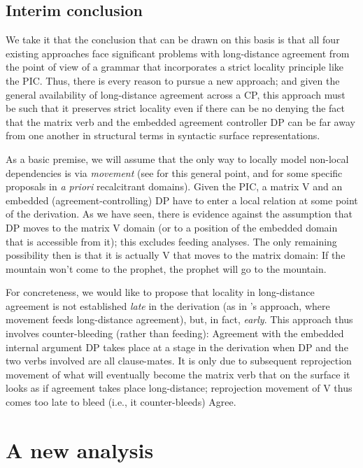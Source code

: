 \documentclass[output=paper
,modfonts
,nonflat]{langsci/langscibook}
\begin{document}
	\subsection{Interim conclusion}
	
	We take it that the conclusion that can be drawn on this basis is that
	all four existing approaches face significant problems with
	long-distance agreement from the point of view of a grammar that
	incorporates a strict locality principle like the PIC. Thus, there is
	every reason to pursue a  new approach; and given the general
	availability of long-distance agreement across a CP, this approach
	must be such that it preserves strict locality even if there can be no
	denying the fact that the matrix verb and the embedded agreement
	controller DP can be far away from one another in structural terms in
	syntactic surface representations. 
	
	As a basic premise, we will assume that the only way to locally model
	non-local dependencies is via {\itshape movement} (see
	\citealt{Hornstein:01,Hornstein:09} for this general point, and
	\citealt{Mueller:14:buf} for some specific proposals in \textit{a priori}
	recalcitrant domains). Given the PIC, a matrix V and an embedded
	(agreement-controlling) DP have to enter a local relation at some
	point of the derivation. As we have seen, there is evidence against
	the assumption that DP moves to the matrix V domain (or to a position
	of the embedded domain that is accessible from it); this excludes feeding
	analyses. The only remaining possibility then is that it is actually
	V that moves to the matrix domain: If the mountain won't come to the
	prophet, the prophet will go to the mountain.
	
	For concreteness, we would like to propose that locality in
	long-distance agreement is not established {\itshape late} in the
	derivation (as in \citealt{PolinskyPotsdam:01}'s approach, where
	movement feeds long-distance agreement), but, in fact, {\it
		early}. This approach thus involves counter-bleeding (rather than
	feeding): Agreement with the embedded internal argument DP takes place
	at a stage in the derivation when DP and the two verbs involved are
	all clause-mates. It is only due to subsequent reprojection movement
	of what will eventually become the matrix verb 
	that on the surface it looks as if agreement takes place
	long-distance; reprojection movement of V thus comes too late to bleed
	(i.e., it counter-bleeds) Agree.
	
	
	\section{A new analysis} \label{sec-bjoe-muel:3}
	
\end{document}

